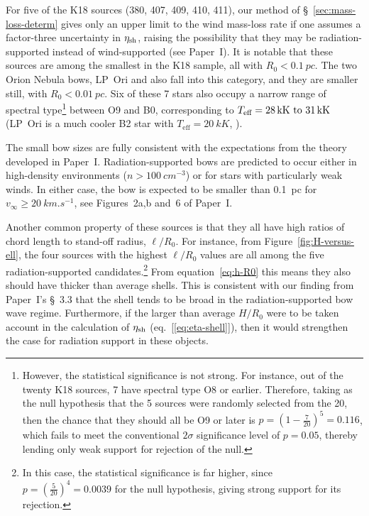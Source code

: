 For five of the K18 sources (380, 407, 409, 410, 411), our method of
\S~\ref{sec:mass-loss-determ} gives only an upper limit to the wind
mass-loss rate if one assumes a factor-three uncertainty in
\(\eta_{\text{sh}}\), raising the possibility that they may be
radiation-supported instead of wind-supported (see Paper~I).  It is
notable that these sources are among the smallest in the K18 sample,
all with \(R_0 < \SI{0.1}{pc}\).  The two Orion Nebula bows, LP~Ori
and \thD{} also fall into this category, and they are smaller still,
with \(R_0 < \SI{0.01}{pc}\).  Six of these 7 stars also occupy a
narrow range of spectral type\footnote{%
  However, the statistical significance is not strong.  For
  instance, out of the twenty K18 sources, 7 have spectral type O8 or
  earlier.  Therefore, taking as the null hypothesis that the 5
  sources were randomly selected from the 20, then the chance that
  they should all be O9 or later is
  \(p = (1 - \frac{7}{20})^5 = 0.116\), which fails to meet the
  conventional \(2\sigma\) significance level of \(p = 0.05\),
  thereby lending only weak support for rejection of the null.} %
between O9 and B0, corresponding to
\(T_{\text{eff}} = \text{\SIrange{28}{31}{kK}}\) (LP~Ori is a much
cooler B2 star with \(T_{\text{eff}} = \SI{20}{kK}\),
\citealp{Petit:2008a, Alecian:2013a}).

The small bow sizes are fully consistent with the expectations from
the theory developed in Paper~I.  Radiation-supported bows are predicted
to occur either in high-density environments
(\(n > \SI{100}{cm^{-3}}\)) or for stars with particularly weak winds.
In either case, the bow is expected to be smaller than \SI{0.1}{pc}
for \(v_\infty \ge \SI{20}{km.s^{-1}}\), see Figures~2a,b and~6 of
Paper~I.\@

Another common property of these sources is that they all have high
ratios of chord length to stand-off radius, \(\ell/R_0\).  For
instance, from Figure~\ref{fig:H-versus-ell}, the four sources with
the highest \(\ell/R_0\) values are all among the five
radiation-supported candidates.\footnote{%
  In this case, the statistical significance is far higher, since
  \(p = (\frac{5}{20})^4 = 0.0039\) for the null hypothesis, giving
  strong support for its rejection.}  From equation~\eqref{eq:h-R0}
this means they also should have thicker than average shells.  This is
consistent with our finding from Paper~I's \S~3.3 that the shell tends
to be broad in the radiation-supported bow wave regime.  Furthermore,
if the larger than average \(H/R_0\) were to be taken account in the
calculation of \(\eta_{\text{sh}}\) (eq.~[\ref{eq:eta-shell}]), then it
would strengthen the case for radiation support in these objects.


